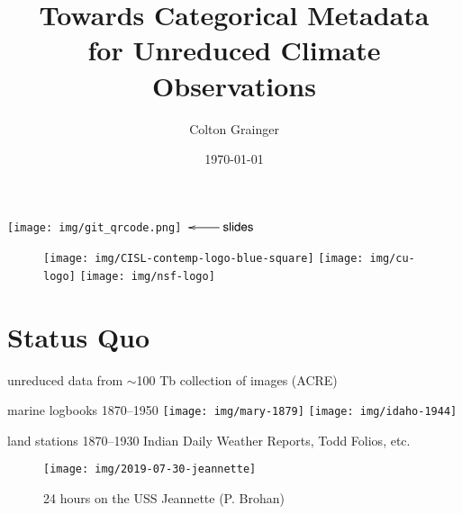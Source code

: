 \documentclass{beamer}
\title[Towards Categorical Metadata]{Towards Categorical Metadata\\ for Unreduced Climate Observations}
\author[C.~Grainger]{Colton Grainger}
\institute{University of Colorado Boulder}
\date{\today}
\begin{document}
\begin{frame}
    \hspace{-5.65em}\texttt{[image: img/git\_qrcode.png]}$\xymatrix{& \mathsf{slides} \ar[l]}$
\titlepage
\begin{figure}
    \texttt{[image: img/CISL-contemp-logo-blue-square]}\hspace{0.5em}
    \texttt{[image: img/cu-logo]}\hspace{0.5em}
    \texttt{[image: img/nsf-logo]}
\end{figure}
\end{frame}

\section{Status Quo}

\begin{frame}

    \begin{center}
        unreduced data from $\sim$100 Tb collection of images (ACRE)
    \end{center}


    \begin{beamerboxesrounded}{marine logbooks 1870--1950}
        \texttt{[image: img/mary-1879]}
        \hspace{0.5em}
        \texttt{[image: img/idaho-1944]}
    \end{beamerboxesrounded}
    \vfill

    \begin{beamerboxesrounded}{land stations 1870--1930}
        Indian Daily Weather Reports, Todd Folios, etc.
    \end{beamerboxesrounded}

\end{frame}

\begin{frame}[fragile]
    \begin{example}
        \begin{figure}
            \texttt{[image: img/2019-07-30-jeannette]}
            \caption{
                24 hours on the USS Jeannette (P. Brohan)
            }
        \end{figure}
    \end{example}
\end{frame}
\end{document}
